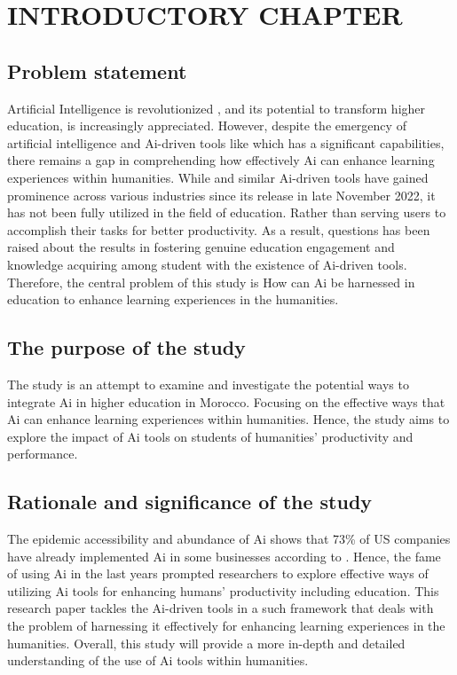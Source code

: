 \chapter{INTRODUCTORY CHAPTER}
\section{Problem statement}
\justifying
Artificial Intelligence is revolutionized , and its potential
to transform higher education, is increasingly appreciated. However, despite the emergency of artificial intelligence and
Ai-driven tools like  which has a significant capabilities,
there remains a gap in comprehending how effectively Ai can
enhance learning experiences within humanities. While 
and similar Ai-driven tools have gained prominence across various
industries since its release in late November 2022, it has not been
fully utilized in the field of education. Rather than serving users
to accomplish their tasks for better productivity. As a result, questions
has been raised about the results in fostering genuine education engagement
and knowledge acquiring among student with the existence of Ai-driven tools.
Therefore, the central problem of this study is How can Ai be harnessed
in education to enhance learning experiences in the humanities.
\section{The purpose of the study}
\justifying
The study is an attempt to examine and investigate the potential ways to integrate Ai in higher education in Morocco.
Focusing on the effective ways that Ai can enhance learning experiences within humanities. Hence, the study aims to
explore the impact of Ai tools on students of humanities' productivity and performance.
\section{Rationale and significance of the study}
\justifying
The epidemic accessibility and abundance of Ai shows that 73\% of US companies have already
implemented Ai in some businesses according to \textcite{pricewaterhousecoopers} .
Hence, the fame of using Ai in the last years prompted researchers to explore effective ways of utilizing Ai tools
for enhancing humans' productivity including education. This research paper tackles the Ai-driven tools in a such framework that
deals with the problem of harnessing it effectively for enhancing learning experiences in the humanities.
Overall, this study will provide a more in-depth and detailed understanding of the use of Ai tools within humanities.
